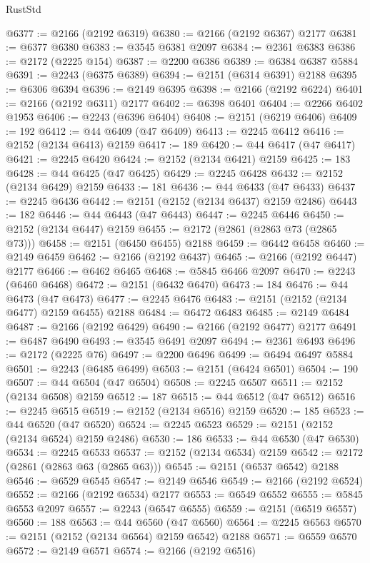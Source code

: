 \begin{lexlean}{RustStd}
\begin{coremodule}
@6377 := @2166 (@2192 @6319)
@6380 := @2166 (@2192 @6367) @2177
@6381 := @6377 @6380
@6383 := @3545 @6381 @2097
@6384 := @2361 @6383
@6386 := @2172 (@2225 @154)
@6387 := @2200 @6386
@6389 := @6384 @6387 @5884
@6391 := @2243 (@6375 @6389)
@6394 := @2151 (@6314 @6391) @2188
@6395 := @6306 @6394
@6396 := @2149 @6395
@6398 := @2166 (@2192 @6224)
@6401 := @2166 (@2192 @6311) @2177
@6402 := @6398 @6401
@6404 := @2266 @6402 @1953
@6406 := @2243 (@6396 @6404)
@6408 := @2151 (@6219 @6406)
@6409 := 192
@6412 := @44 @6409 (@47 @6409)
@6413 := @2245 @6412
@6416 := @2152 (@2134 @6413) @2159
@6417 := 189
@6420 := @44 @6417 (@47 @6417)
@6421 := @2245 @6420
@6424 := @2152 (@2134 @6421) @2159
@6425 := 183
@6428 := @44 @6425 (@47 @6425)
@6429 := @2245 @6428
@6432 := @2152 (@2134 @6429) @2159
@6433 := 181
@6436 := @44 @6433 (@47 @6433)
@6437 := @2245 @6436
@6442 := @2151 (@2152 (@2134 @6437) @2159 @2486)
@6443 := 182
@6446 := @44 @6443 (@47 @6443)
@6447 := @2245 @6446
@6450 := @2152 (@2134 @6447) @2159
@6455 := @2172 (@2861 (@2863 @73 (@2865 @73)))
@6458 := @2151 (@6450 @6455) @2188
@6459 := @6442 @6458
@6460 := @2149 @6459
@6462 := @2166 (@2192 @6437)
@6465 := @2166 (@2192 @6447) @2177
@6466 := @6462 @6465
@6468 := @5845 @6466 @2097
@6470 := @2243 (@6460 @6468)
@6472 := @2151 (@6432 @6470)
@6473 := 184
@6476 := @44 @6473 (@47 @6473)
@6477 := @2245 @6476
@6483 := @2151 (@2152 (@2134 @6477) @2159 @6455) @2188
@6484 := @6472 @6483
@6485 := @2149 @6484
@6487 := @2166 (@2192 @6429)
@6490 := @2166 (@2192 @6477) @2177
@6491 := @6487 @6490
@6493 := @3545 @6491 @2097
@6494 := @2361 @6493
@6496 := @2172 (@2225 @76)
@6497 := @2200 @6496
@6499 := @6494 @6497 @5884
@6501 := @2243 (@6485 @6499)
@6503 := @2151 (@6424 @6501)
@6504 := 190
@6507 := @44 @6504 (@47 @6504)
@6508 := @2245 @6507
@6511 := @2152 (@2134 @6508) @2159
@6512 := 187
@6515 := @44 @6512 (@47 @6512)
@6516 := @2245 @6515
@6519 := @2152 (@2134 @6516) @2159
@6520 := 185
@6523 := @44 @6520 (@47 @6520)
@6524 := @2245 @6523
@6529 := @2151 (@2152 (@2134 @6524) @2159 @2486)
@6530 := 186
@6533 := @44 @6530 (@47 @6530)
@6534 := @2245 @6533
@6537 := @2152 (@2134 @6534) @2159
@6542 := @2172 (@2861 (@2863 @63 (@2865 @63)))
@6545 := @2151 (@6537 @6542) @2188
@6546 := @6529 @6545
@6547 := @2149 @6546
@6549 := @2166 (@2192 @6524)
@6552 := @2166 (@2192 @6534) @2177
@6553 := @6549 @6552
@6555 := @5845 @6553 @2097
@6557 := @2243 (@6547 @6555)
@6559 := @2151 (@6519 @6557)
@6560 := 188
@6563 := @44 @6560 (@47 @6560)
@6564 := @2245 @6563
@6570 := @2151 (@2152 (@2134 @6564) @2159 @6542) @2188
@6571 := @6559 @6570
@6572 := @2149 @6571
@6574 := @2166 (@2192 @6516)

\end{coremodule}
\end{lexlean}
